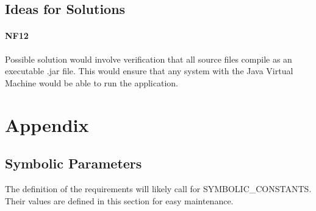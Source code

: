 \documentclass[12pt, titlepage]{article}
\begin{document}
\subsection{Ideas for Solutions}
\paragraph{NF12}
Possible solution would involve verification that all source files compile as an executable .jar file. This would ensure that any system with the Java Virtual Machine would be able to run the application.

\newpage





\newpage

\section{Appendix}

\subsection{Symbolic Parameters}

The definition of the requirements will likely call for SYMBOLIC\_CONSTANTS.
Their values are defined in this section for easy maintenance.
\end{document}
